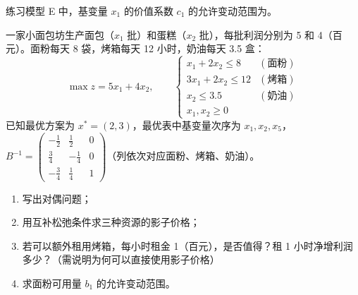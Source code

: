 \Q[\diff{提升·K8}] 练习模型 E 中，基变量 $x_1$ 的价值系数 $c_1$ 的允许变动范围为\underline{\hspace{2.5cm}}。

\medskip
{}\noindent{}

\Q[\diff{提升·K2+K4+K5+K7}] 一家小面包坊生产面包（$x_1$ 批）和蛋糕（$x_2$ 批），每批利润分别为 5 和 4（百元）。面粉每天 8 袋，烤箱每天 12 小时，奶油每天 3.5 盒：
\[
\max z=5x_1+4x_2,\qquad
\begin{cases}x_1+2x_2\le8&(\text{面粉})\\ 3x_1+2x_2\le12&(\text{烤箱})\\ x_2\le3.5&(\text{奶油})\\ x_1,x_2\ge0\end{cases}
\]
已知最优方案为 $x^*=(2,3)$，最优表中基变量次序为 $x_1,x_2,x_5$，
$B^{-1}=\begin{pmatrix}-\frac12&\frac12&0\\[2pt]\frac34&-\frac14&0\\[2pt]-\frac34&\frac14&1\end{pmatrix}$（列依次对应面粉、烤箱、奶油）。
\begin{enumerate}[label=(\arabic*)]
  \item 写出对偶问题；
  \item 用互补松弛条件求三种资源的影子价格；
  \item 若可以额外租用烤箱，每小时租金 1（百元），是否值得？租 1 小时净增利润多少？（需说明为何可以直接使用影子价格）
  \item 求面粉可用量 $b_1$ 的允许变动范围。
\end{enumerate}
\begin{figure}[!htbp]\centering
{}
\end{figure}


